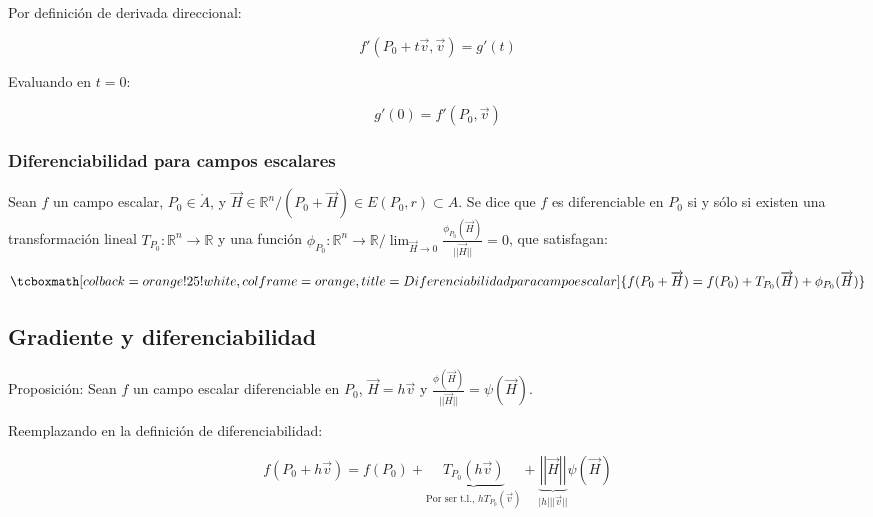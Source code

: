 \documentclass{article}
\renewcommand{\Bbb}{\mathbb}
\begin{document}
Por definición de derivada direccional:

\begin{equation}
f'(P_0 + t \overrightarrow{v}, \overrightarrow{v}) = g'(t) 
\end{equation}

Evaluando en $t = 0$:

\begin{equation}
g'(0) = f'(P_0, \overrightarrow{v})
\end{equation}

\subsubsection{Diferenciabilidad para campos escalares}

Sean $f$ un campo escalar, $P_0 \in \mathring{A}$, y $\overrightarrow{H} \in \Bbb R^n / (P_0 + \overrightarrow{H}) \in E(P_0, r) \subset A$. Se dice que $f$ es diferenciable en $P_0$ si y sólo si existen una transformación lineal $T_{P_0}: \Bbb R^n \rightarrow \Bbb R$ y una función $\phi_{P_0}: \Bbb R^n \rightarrow \Bbb R / \lim_{\overrightarrow{H} \rightarrow 0} \frac{\phi_{P_0}(\overrightarrow{H})}{||\overrightarrow{H}||} = 0$, que satisfagan:

\begin{equation}
\tcboxmath[colback=orange!25!white,colframe=orange, title=Diferenciabilidad para campo escalar]
{ f(P_0 + \overrightarrow{H}) = f(P_0) + T_{P_0}(\overrightarrow{H}) + \phi_{P_0}(\overrightarrow{H}) }
\end{equation}

\subsection{Gradiente y diferenciabilidad}

Proposición: Sean $f$ un campo escalar diferenciable en $P_0$, $\overrightarrow{H} = h \overrightarrow{v}$ y $\frac{\phi(\overrightarrow{H})}{||\overrightarrow{H}||} = \psi(\overrightarrow{H})$.

Reemplazando en la definición de diferenciabilidad:

\begin{equation}
f(P_0 + h \overrightarrow{v}) = f(P_0) + \underbrace{ T_{P_0}(h \overrightarrow{v}) }_{\text{Por ser t.l., } h T_{P_0}(\overrightarrow{v})} + \underbrace{ \left|\left|\overrightarrow{H}\right|\right| }_{|h| ||\overrightarrow{v}||} \psi(\overrightarrow{H})
\end{equation}
\end{document}
